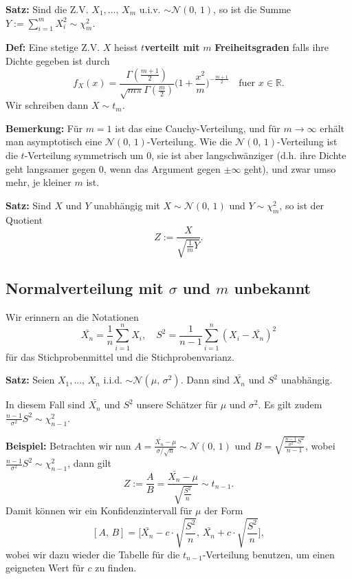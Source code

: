 \documentclass[a4paper]{extarticle}
\begin{document}
\begin{cbox}
    \textbf{Satz:} Sind die Z.V. $X_1,..., \, X_m$ u.i.v. $\sim \mathcal{N}(0, \, 1)$, so ist die Summe $Y := \sum_{i = 1}^m X_i^2 \sim \chi^2_m$.
\end{cbox}

\textbf{Def:} Eine stetige Z.V. $X$ heisst $t$\textbf{verteilt mit} $m$ \textbf{Freiheitsgraden} falls ihre Dichte gegeben ist durch
\[
    f_X(x) = \frac{\Gamma(\frac{m + 1}{2})}{\sqrt{m \pi} \Gamma(\frac{m}{2})} \Big(1 + \frac{x^2}{m} \Big)^{- \frac{m + 1}{2}} \quad \text{fuer } x \in \mathbb{R}.
\]
Wir schreiben dann $X \sim t_m$.

\textbf{Bemerkung:} Für $m = 1$ ist das eine Cauchy-Verteilung, und für $m \to \infty$ erhält man asymptotisch eine $\mathcal{N}(0, \, 1)$-Verteilung. Wie die $\mathcal{N}(0, \, 1)$-Verteilung ist die $t$-Verteilung symmetrisch um $0$, sie ist aber langschwänziger (d.h. ihre Dichte geht langsamer gegen $0$, wenn das Argument gegen $\pm \infty$ geht), und zwar umso mehr, je kleiner $m$ ist.

\begin{cbox}
    \textbf{Satz:} Sind $X$ und $Y$ unabhängig mit $X \sim \mathcal{N}(0, \, 1)$ und $Y \sim \chi^2_m$, so ist der Quotient
    \[
        Z := \frac{X}{\sqrt{\frac{1}{m} Y}}.
    \]
\end{cbox}

\subsection{Normalverteilung mit $\sigma$ und $m$ unbekannt}

Wir erinnern an die Notationen
\[
    \bar{X_n} = \frac{1}{n} \sum_{i = 1}^n X_i, \quad S^2 = \frac{1}{n - 1}\sum_{i = 1}^n(X_i - \bar{X_n})^2
\]
für das Stichprobenmittel und die Stichprobenvarianz.

\begin{cbox}
    \textbf{Satz:} Seien $X_1,..., \, X_n$ i.i.d. $\sim \mathcal{N}(\mu, \, \sigma^2)$. Dann sind $\bar{X_n}$ und $S^2$ unabhängig.
\end{cbox}

In diesem Fall sind $\bar{X_n}$ und $S^2$ unsere Schätzer für $\mu$ und $\sigma^2$. Es gilt zudem $\frac{n - 1}{\sigma^2}S^2 \sim \chi^2_{n-1}$.

\begin{ebox}
    \textbf{Beispiel:} Betrachten wir nun $A = \frac{\bar{X_n} - \mu}{\sigma / \sqrt{n}} \sim \mathcal{N}(0, \, 1)$ und $B = \sqrt{\frac{\frac{n - 1}{\sigma^2}S^2}{n - 1}}$, wobei $\frac{n - 1}{\sigma^2}S^2 \sim \chi^2_{n - 1}$, dann gilt
    \[
        Z := \frac{A}{B} = \frac{\bar{X_n} - \mu}{\sqrt{\frac{S^2}{n}}} \sim t_{n - 1}.
    \]
    Damit können wir ein Konfidenzintervall für $\mu$ der Form
    \[
        [A, \, B] = \Big[\bar{X_n} - c \cdot \sqrt{\frac{S^2}{n}}, \, \bar{X_n} + c \cdot \sqrt{\frac{S^2}{n}}\Big],
    \]
    wobei wir dazu wieder die Tabelle für die $t_{n-1}$-Verteilung benutzen, um einen geigneten Wert für $c$ zu finden.
\end{ebox}
\end{document}
